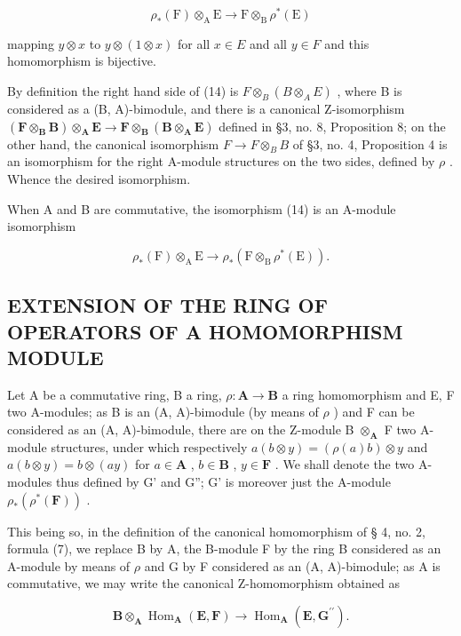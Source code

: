 \[
\rho_ {*} (\mathrm{F}) \otimes_ {\mathrm{A}} \mathrm{E} \rightarrow \mathrm{F} \otimes_ {\mathrm{B}} \rho^ {*} (\mathrm{E})\tag{14}
\]

mapping \(y \otimes x\) to \(y \otimes (1 \otimes x)\) for all \(x \in E\) and all \(y \in F\) and this homomorphism is bijective.

By definition the right hand side of (14) is \(F \otimes_{B} (B \otimes_{A} E)\) , where B is considered as a (B, A)-bimodule, and there is a canonical Z-isomorphism \((\mathbf{F} \otimes_{\mathbf{B}} \mathbf{B}) \otimes_{\mathbf{A}} \mathbf{E} \to \mathbf{F} \otimes_{\mathbf{B}} (\mathbf{B} \otimes_{\mathbf{A}} \mathbf{E})\) defined in §3, no. 8, Proposition 8; on the other hand, the canonical isomorphism \(F \to F \otimes_{B} B\) of §3, no. 4, Proposition 4 is an isomorphism for the right A-module structures on the two sides, defined by \(\rho\) . Whence the desired isomorphism.

When A and B are commutative, the isomorphism (14) is an A-module isomorphism

\[
\rho_ {*} (\mathrm{F}) \otimes_ {\mathrm{A}} \mathrm{E} \rightarrow \rho_ {*} (\mathrm{F} \otimes_ {\mathrm{B}} \rho^ {*} (\mathrm{E})).
\]

\subsection{EXTENSION OF THE RING OF OPERATORS OF A HOMOMORPHISM MODULE}

Let A be a commutative ring, B a ring, \(\rho: \mathbf{A} \to \mathbf{B}\) a ring homomorphism and E, F two A-modules; as B is an (A, A)-bimodule (by means of \(\rho\) ) and F can be considered as an (A, A)-bimodule, there are on the Z-module B \(\otimes_{\mathbf{A}}\) F two A-module structures, under which respectively \(a(b \otimes y) = (\rho(a)b) \otimes y\) and \(a(b \otimes y) = b \otimes (ay)\) for \(a \in \mathbf{A}\) , \(b \in \mathbf{B}\) , \(y \in \mathbf{F}\) . We shall denote the two A-modules thus defined by G' and G''; G' is moreover just the A-module \(\rho_*(\rho^*(\mathbf{F}))\) .

This being so, in the definition of the canonical homomorphism of § 4, no. 2, formula (7), we replace B by A, the B-module F by the ring B considered as an A-module by means of \(\rho\) and G by F considered as an (A, A)-bimodule; as A is commutative, we may write the canonical Z-homomorphism obtained as

\[
\mathbf {B} \otimes_ {\mathbf {A}} \operatorname{Hom} _ {\mathbf {A}} (\mathbf {E}, \mathbf {F}) \rightarrow \operatorname{Hom} _ {\mathbf {A}} (\mathbf {E}, \mathbf {G} ^ {\prime \prime}).\tag{15}
\]

